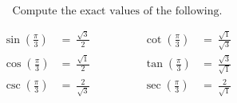 $$
\text{Compute the exact values of the following.}
$$

$$
\begin{align*}
  \sin\left(\frac{\pi}{3}\right) &=\ \frac{\sqrt{3}}{2} \qquad&\qquad \cot\left(\frac{\pi}{3}\right) &=\ \frac{\sqrt{1}}{\sqrt{3}} \\[2ex]
  \cos\left(\frac{\pi}{3}\right) &=\ \frac{\sqrt{1}}{2} \qquad&\qquad \tan\left(\frac{\pi}{3}\right) &=\ \frac{\sqrt{3}}{\sqrt{1}} \\[2ex]
  \csc\left(\frac{\pi}{3}\right) &=\ \frac{2}{\sqrt{3}} \qquad&\qquad \sec\left(\frac{\pi}{3}\right) &=\ \frac{2}{\sqrt{1}}
\end{align*}
$$
